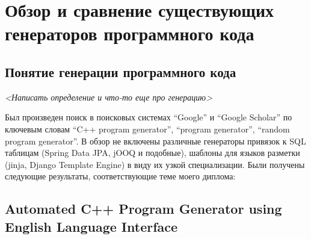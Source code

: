 \section{Обзор и сравнение существующих генераторов программного кода}

\subsection{Понятие генерации программного кода}

\textit{<Написать определение и что-то еще про генерацию>}

Был произведен поиск в поисковых системах “Google” и “Google Scholar”
по ключевым словам “C++ program generator”, “program generator”, “random program generator”.
В обзор не включены различные генераторы привязок к SQL таблицам
(Spring Data JPA, jOOQ и подобные), шаблоны для языков разметки
(jinja, Django Template Engine) в виду их узкой специализации.
Были получены следующие результаты, соответствующие теме моего диплома:





\subsection{Automated C++ Program Generator using English Language Interface}

